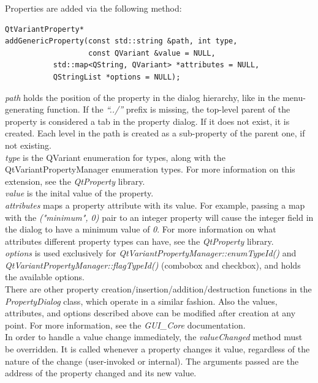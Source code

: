 \documentclass{article}
\begin{document}
Properties are added via the following method:
\begin{lstlisting}
QtVariantProperty* 
addGenericProperty(const std::string &path, int type, 
                   const QVariant &value = NULL, 
		   std::map<QString, QVariant> *attributes = NULL,
		   QStringList *options = NULL);
\end{lstlisting}

\emph{path} holds the position of the property in the dialog hierarchy, like in the menu-generating function. If the \emph{``../''} prefix is missing, the top-level parent of the property is considered a tab in the property dialog. If it does not exist, it is created. Each level in the path is created as a sub-property of the parent one, if not existing.\\

\emph{type} is the QVariant enumeration for types, along with the QtVariantPropertyManager enumeration types. For more information on this extension, see the \emph{QtProperty} library.\\

\emph{value} is the inital value of the property.\\

\emph{attributes} maps a property attribute with its value. For example, passing a map with the \emph{("minimum", 0)} pair to an integer property will cause the integer field in the dialog to have a minimum value of \emph{0}. For more information on what attributes different property types can have, see the \emph{QtProperty} library.\\

\emph{options} is used exclusively for \emph{QtVariantPropertyManager::enumTypeId()} and \emph{QtVariantPropertyManager::flagTypeId()} (combobox and checkbox), and holds the available options. \\

There are other property creation/insertion/addition/destruction functions in the \emph{PropertyDialog} class, which operate in a similar fashion. Also the values, attributes, and options described above can be modified after creation at any point. For more information, see the \emph{GUI\_Core} documentation.\\

In order to handle a value change immediately, the \emph{valueChanged} method must be overridden. It is called whenever a property changes it value, regardless of the nature of the change (user-invoked or internal). The arguments passed are the address of the property changed and its new value.\\
\end{document}
